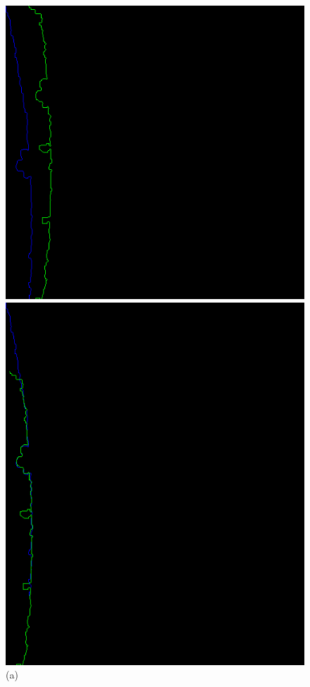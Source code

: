 \begin{figure}[h]
    \centering
    \begin{minipage}{0.49\textwidth}
        \centering
        \includegraphics[width=\textwidth]{images/before_matching.png} %
        \caption*{(a)} 
    \end{minipage}\hfill
    \begin{minipage}{0.49\textwidth}
        \centering
        \includegraphics[width=\textwidth]{images/0.24225865209471767contours.png} %

\end{minipage}
\end{figure}
